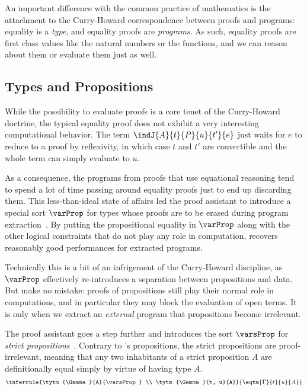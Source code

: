 An important difference with the common practice of mathematics is the 
attachment to the Curry-Howard correspondence between proofs and programs:
equality is a \emph{type}, and equality proofs are \emph{programs}.
% 
As such, equality proofs are first class values like the natural numbers
or the functions, and we can reason about them or evaluate them just as well.

\subsection{Types and Propositions}

While the possibility to evaluate proofs is a core tenet of the Curry-Howard
doctrine, the typical equality proof does not exhibit a very interesting 
computational behavior. 
% 
The term \( \indJ{A}{t}{P}{u}{t'}{e} \) just waits for \( e \) to reduce to
a proof by reflexivity, in which case \( t \) and \( t' \) are convertible and
the whole term can simply evaluate to \( u \). 

As a consequence, the programs 
from proofs that use equational reasoning  tend to spend a lot of time passing 
around equality proofs just to end up discarding them.
% 
This less-than-ideal state of affairs led the \Coq proof assistant to introduce
a special sort \( \varProp \) for types whose proofs are to be erased during 
program extraction~.
% 
By putting the propositional equality in \( \varProp \) along with the other logical 
constraints that do not play any role in computation, \Coq recovers reasonably good 
performances for extracted programs. 

Technically this is a bit of an infrigement of the Curry-Howard discipline, as \( \varProp \) 
effectively re-introduces a separation between propositions and data.
% 
But make no mistake: proofs of propositions still play their normal role in computations, and in 
particular they may block the evaluation of open terms. 
% 
It is only when we extract an \emph{external} program that propositions become irrelevant.

The \Lean proof assistant goes a step further and introduces the sort 
% 
% 
\( \varsProp \) for \emph{strict propositions}~.
% 
% 
Contrary to \Coq's propositions, the strict propositions are proof-irrelevant, 
meaning that any two inhabitants of a strict proposition \( A \) are 
definitionally equal simply by virtue of having type \( A \).
% 
\[
\inferrule{\tytm{\Gamma}{A}{\varsProp} \\ \tytm{\Gamma}{t, u}{A}}{\eqtm{\Gamma}{t}{u}{A}}
\]

